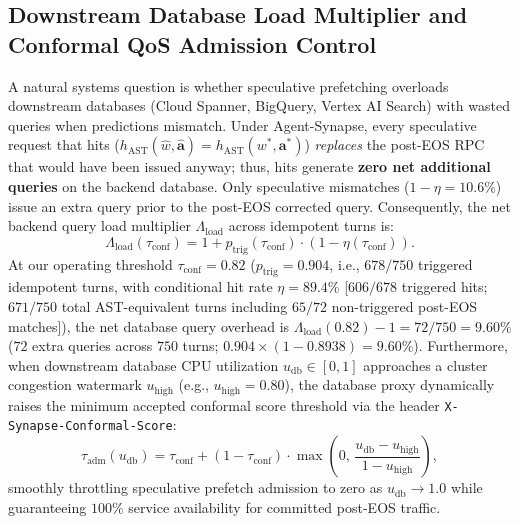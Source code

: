\documentclass[10pt,conference]{IEEEtran}
\begin{document}
\subsection{Downstream Database Load Multiplier and Conformal QoS Admission Control}
A natural systems question is whether speculative prefetching overloads downstream databases (Cloud Spanner, BigQuery, Vertex AI Search) with wasted queries when predictions mismatch. Under Agent-Synapse, every speculative request that hits ($h_{\text{AST}}(\hat{w}, \hat{\mathbf{a}}) = h_{\text{AST}}(w^*, \mathbf{a}^*)$) \emph{replaces} the post-EOS RPC that would have been issued anyway; thus, hits generate \textbf{zero net additional queries} on the backend database. Only speculative mismatches ($1 - \eta = 10.6\%$) issue an extra query prior to the post-EOS corrected query. Consequently, the net backend query load multiplier $\Lambda_{\text{load}}$ across idempotent turns is:
\begin{equation}
\Lambda_{\text{load}}(\tau_{\text{conf}}) = 1 + p_{\text{trig}}(\tau_{\text{conf}}) \cdot \left(1 - \eta(\tau_{\text{conf}})\right).
\label{eq:load_multiplier}
\end{equation}
At our operating threshold $\tau_{\text{conf}} = 0.82$ ($p_{\text{trig}} = 0.904$, i.e., $678/750$ triggered idempotent turns, with conditional hit rate $\eta = 89.4\%$ [$606/678$ triggered hits; $671/750$ total AST-equivalent turns including $65/72$ non-triggered post-EOS matches]), the net database query overhead is $\Lambda_{\text{load}}(0.82) - 1 = 72/750 = 9.60\%$ ($72$ extra queries across $750$ turns; $0.904 \times (1 - 0.8938) = 9.60\%$). Furthermore, when downstream database CPU utilization $u_{\text{db}} \in [0, 1]$ approaches a cluster congestion watermark $u_{\text{high}}$ (e.g., $u_{\text{high}} = 0.80$), the database proxy dynamically raises the minimum accepted conformal score threshold via the header \texttt{X-Synapse-Conformal-Score}:
\begin{equation}
\tau_{\text{adm}}(u_{\text{db}}) = \tau_{\text{conf}} + (1 - \tau_{\text{conf}}) \cdot \max\!\left(0,\, \frac{u_{\text{db}} - u_{\text{high}}}{1 - u_{\text{high}}}\right),
\label{eq:qos_admission}
\end{equation}
smoothly throttling speculative prefetch admission to zero as $u_{\text{db}} \to 1.0$ while guaranteeing $100\%$ service availability for committed post-EOS traffic.
\end{document}
